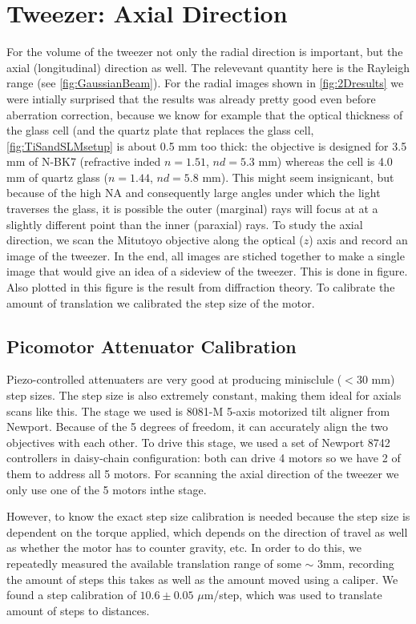 \section{Tweezer: Axial Direction}\label{sec:Tweezer3D}

For the volume of the tweezer not only the radial direction is important, but the axial (longitudinal) direction as well. 
The relevevant quantity here is the Rayleigh range (see \cref{fig:GaussianBeam}).
For the radial images shown in \cref{fig:2Dresults} we were intially surprised that the results was already pretty good even before aberration correction, because we know for example that the optical thickness of the glass cell (and the quartz plate that replaces the glass cell, \cref{fig:TiSandSLMsetup} is about 0.5 mm too thick: the objective is designed for 3.5 mm of N-BK7 (refractive inded $n = 1.51$, $nd = 5.3$ mm) whereas the cell is 4.0 mm of quartz glass ($n = 1.44$, $nd = 5.8$ mm). 
This might seem insignicant, but because of the high \ac{NA} and consequently large angles under which the light traverses the glass, it is possible the outer (marginal) rays will focus at at a slightly different point than the inner (paraxial) rays. 
To study the axial direction, we scan the Mitutoyo objective along the optical ($z$) axis and record an image of the tweezer. 
In the end, all images are stiched together to make a single image that would give an idea of a sideview of the tweezer.
This is done in figure.
Also plotted in this figure is the result from diffraction theory. 
To calibrate the amount of translation we calibrated the step size of the motor.


\subsection{Picomotor Attenuator Calibration}

Piezo-controlled attenuaters are very good at producing minisclule ($<30$ mm) step sizes. The step size is also extremely constant, making them ideal for axials scans like this.
The stage we used is 8081-M 5-axis motorized tilt aligner from Newport. 
Because of the 5 degrees of freedom, it can accurately align the two objectives with each other. 
To drive this stage, we used a set of Newport 8742 controllers in daisy-chain configuration: both can drive 4 motors so we have 2 of them to address all 5 motors.
For scanning the axial direction of the tweezer we only use one of the 5 motors inthe stage. 


However, to know the exact step size calibration is needed because the step size is dependent on the torque applied, which depends on the direction of travel as well as whether the motor has to counter gravity, etc.
In order to do this, we repeatedly measured the available translation range of some $\sim$ 3mm, recording the amount of steps this takes as well as the amount moved using a caliper. 
We found a step calibration of $10.6 \pm 0.05$ $\mu$m/step, which was used to translate amount of steps to distances. 









